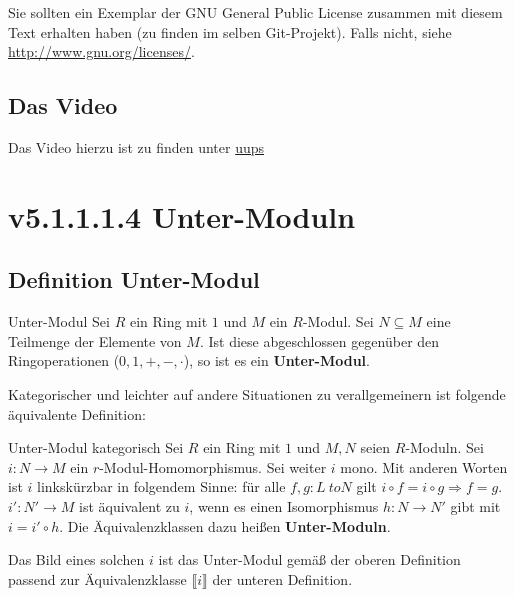 \documentclass[a4paper]{amsart}
\theoremstyle{definition}
\begin{document}
Sie sollten ein Exemplar der GNU General Public License zusammen mit diesem Text erhalten haben
(zu finden im selben Git-Projekt).
Falls nicht, siehe \url{http://www.gnu.org/licenses/}.

\subsection*{Das Video}
Das Video hierzu ist zu finden unter
{\tiny
   \url{uups}
}

\section{v5.1.1.1.4 Unter-Moduln}

\subsection{Definition Unter-Modul}
\begin{Definition}{Unter-Modul}
   Sei $R$ ein Ring mit $1$ und $M$ ein $R$-Modul. Sei $N \subseteq M$ eine Teilmenge der Elemente von $M$. Ist diese abgeschlossen gegenüber den Ringoperationen ($0,1,+,-,\cdot$), so ist es ein \textbf{Unter-Modul}.
\end{Definition}

Kategorischer und leichter auf andere Situationen zu verallgemeinern ist folgende äquivalente Definition:
\begin{Definition}{Unter-Modul kategorisch}
   Sei $R$ ein Ring mit $1$ und $M,N$ seien $R$-Moduln. Sei $i \colon N \to M$ ein $r$-Modul-Homomorphismus. Sei weiter $i$ mono. Mit anderen Worten ist $i$ linkskürzbar in folgendem Sinne: für alle $f,g \colon L \ to N$ gilt $i \circ f = i \circ g \Rightarrow f = g$. $i' \colon N' \to M$ ist äquivalent zu $i$, wenn es einen Isomorphismus $h \colon N \to N'$ gibt mit $i = i' \circ h$. Die Äquivalenzklassen dazu heißen \textbf{Unter-Moduln}.
\end{Definition}
Das Bild eines solchen $i$ ist das Unter-Modul gemäß der oberen Definition passend zur Äquivalenzklasse $\llbracket i \rrbracket$ der unteren Definition.
\end{document}
